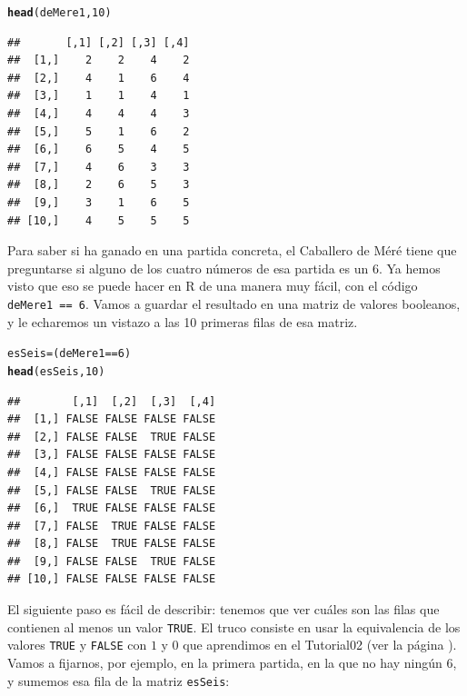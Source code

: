 \documentclass[10pt,a4paper]{article}\usepackage[]{graphicx}\usepackage[]{color}
\makeatletter
\newcommand{\hlnum}[1]{\textcolor[rgb]{0.686,0.059,0.569}{#1}}%
\newcommand{\hlopt}[1]{\textcolor[rgb]{0,0,0}{#1}}%
\newcommand{\hlstd}[1]{\textcolor[rgb]{0.345,0.345,0.345}{#1}}%
\newcommand{\hlkwb}[1]{\textcolor[rgb]{0.69,0.353,0.396}{#1}}%
\newcommand{\hlkwd}[1]{\textcolor[rgb]{0.737,0.353,0.396}{\textbf{#1}}}%
\newenvironment{kframe}{%
 \def\at@end@of@kframe{}%
 \ifinner\ifhmode%
  \def\at@end@of@kframe{\end{minipage}}%
  \begin{minipage}{\columnwidth}%
 \fi\fi%
 \def\FrameCommand##1{\hskip\@totalleftmargin \hskip-\fboxsep
 \colorbox{shadecolor}{##1}\hskip-\fboxsep
     \hskip-\linewidth \hskip-\@totalleftmargin \hskip\columnwidth}%
 \MakeFramed {\advance\hsize-\width
   \@totalleftmargin\z@ \linewidth\hsize
   \@setminipage}}%
 {\par\unskip\endMakeFramed%
 \at@end@of@kframe}
\newenvironment{knitrout}{}{} %
\newcounter {cont01}
\makeatother
\begin{document}
\begin{knitrout}
\color{fgcolor}\begin{kframe}
\begin{alltt}
\hlkwd{head}\hlstd{(deMere1,} \hlnum{10}\hlstd{)}
\end{alltt}
\begin{verbatim}
##       [,1] [,2] [,3] [,4]
##  [1,]    2    2    4    2
##  [2,]    4    1    6    4
##  [3,]    1    1    4    1
##  [4,]    4    4    4    3
##  [5,]    5    1    6    2
##  [6,]    6    5    4    5
##  [7,]    4    6    3    3
##  [8,]    2    6    5    3
##  [9,]    3    1    6    5
## [10,]    4    5    5    5
\end{verbatim}
\end{kframe}
\end{knitrout}
Para saber si ha ganado en una partida concreta, el Caballero de Méré tiene que preguntarse si alguno de los cuatro números de esa partida es un 6. Ya hemos visto que eso se puede hacer en R de una manera muy fácil, con el código {\tt deMere1 == 6}. Vamos a guardar el resultado en una matriz de valores booleanos, y le echaremos un vistazo a las 10 primeras filas de esa matriz.
\begin{knitrout}
\color{fgcolor}\begin{kframe}
\begin{alltt}
\hlstd{esSeis} \hlkwb{=} \hlstd{(deMere1} \hlopt{==} \hlnum{6}\hlstd{)}
\hlkwd{head}\hlstd{(esSeis,} \hlnum{10}\hlstd{)}
\end{alltt}
\begin{verbatim}
##        [,1]  [,2]  [,3]  [,4]
##  [1,] FALSE FALSE FALSE FALSE
##  [2,] FALSE FALSE  TRUE FALSE
##  [3,] FALSE FALSE FALSE FALSE
##  [4,] FALSE FALSE FALSE FALSE
##  [5,] FALSE FALSE  TRUE FALSE
##  [6,]  TRUE FALSE FALSE FALSE
##  [7,] FALSE  TRUE FALSE FALSE
##  [8,] FALSE  TRUE FALSE FALSE
##  [9,] FALSE FALSE  TRUE FALSE
## [10,] FALSE FALSE FALSE FALSE
\end{verbatim}
\end{kframe}
\end{knitrout}
El siguiente paso es fácil de describir: tenemos que ver cuáles son las filas que contienen al menos un valor {\tt TRUE}. El truco consiste en usar la equivalencia de los valores {\tt TRUE} y {\tt FALSE} con $1$ y $0$ que aprendimos en el Tutorial02 (ver la página  \pageref{tut02-tut02:subsubsec:BooleanosComoUnosCeros}). Vamos a fijarnos, por ejemplo, en la primera partida, en la que no hay ningún $6$, y sumemos esa fila de la matriz {\tt esSeis}:
\end{document}
